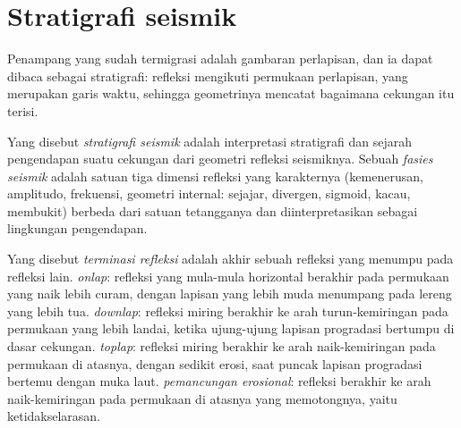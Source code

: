 \section{Stratigrafi seismik}

Penampang yang sudah termigrasi adalah gambaran perlapisan, dan ia dapat dibaca sebagai
stratigrafi: refleksi mengikuti permukaan perlapisan, yang merupakan
garis waktu, sehingga geometrinya mencatat bagaimana cekungan itu terisi.

\begin{definition}\label{def:b3:exploration-seismology:seismic-stratigraphy}
Yang disebut \emph{stratigrafi seismik} adalah interpretasi
stratigrafi dan sejarah pengendapan suatu cekungan dari geometri
refleksi seismiknya. Sebuah \emph{fasies seismik} adalah satuan
tiga dimensi refleksi yang karakternya (kemenerusan, amplitudo,
frekuensi, geometri internal: sejajar, divergen, sigmoid, kacau, membukit)
berbeda dari satuan tetangganya dan diinterpretasikan sebagai lingkungan
pengendapan.
\end{definition}

\begin{definition}\label{def:b3:exploration-seismology:terminations}
Yang disebut \emph{terminasi refleksi} adalah akhir sebuah
refleksi yang menumpu pada refleksi lain. \emph{onlap}: refleksi yang mula-mula horizontal
berakhir pada permukaan yang naik lebih curam, dengan lapisan yang lebih muda
menumpang pada lereng yang lebih tua. \emph{downlap}: refleksi miring
berakhir ke arah turun-kemiringan pada permukaan yang lebih landai, ketika ujung-ujung
lapisan progradasi bertumpu di dasar cekungan. \emph{toplap}: refleksi miring
berakhir ke arah naik-kemiringan pada permukaan di atasnya, dengan sedikit erosi, saat
puncak lapisan progradasi bertemu dengan muka laut. \emph{pemancungan
erosional}: refleksi berakhir ke arah naik-kemiringan pada
permukaan di atasnya yang memotongnya, yaitu ketidakselarasan.
\end{definition}

